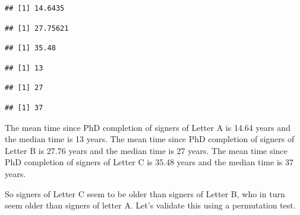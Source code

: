 \documentclass[]{article}
\begin{document}
\begin{verbatim}
## [1] 14.6435
\end{verbatim}

\begin{verbatim}
## [1] 27.75621
\end{verbatim}

\begin{verbatim}
## [1] 35.48
\end{verbatim}

\begin{verbatim}
## [1] 13
\end{verbatim}

\begin{verbatim}
## [1] 27
\end{verbatim}

\begin{verbatim}
## [1] 37
\end{verbatim}

The mean time since PhD completion of signers of Letter A is 14.64 years
and the median time is 13 years. The mean time since PhD completion of
signers of Letter B is 27.76 years and the median time is 27 years. The
mean time since PhD completion of signers of Letter C is 35.48 years and
the median time is 37 years.

So signers of Letter C seem to be older than signers of Letter B, who in
turn seem older than signers of letter A. Let's validate this using a
permutation test.
\end{document}
